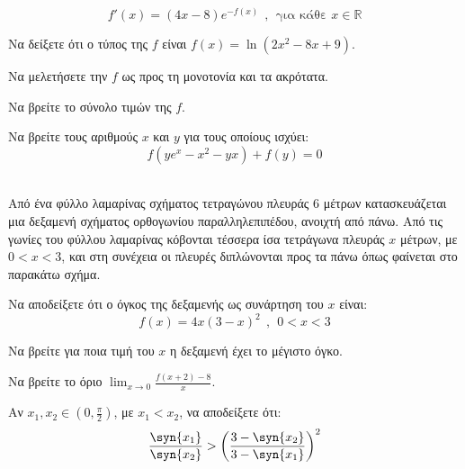 \documentclass[twoside,nofonts,internet,math,spyros]{frontisthrio-diag}
\begin{document}
\begin{thema}
\[ f'(x)=(4x-8)e^{-f(x)}\ \ ,\ \ \textrm{για κάθε }x\in\mathbb{R} \]
\begin{erwthma}
\item Να δείξετε ότι ο τύπος της $ f $ είναι $ f(x)=\ln{\left(2x^2-8x+9\right)} $.
\item Να μελετήσετε την $ f $ ως προς τη μονοτονία και τα ακρότατα.
\item Να βρείτε το σύνολο τιμών της $ f $.
\item Να βρείτε τους αριθμούς $ x $ και $ y $ για τους οποίους ισχύει:
\[ f\left( ye^x-x^2-yx\right)+f(y)=0 \]
\end{erwthma}
\item \mbox{}\\
Από ένα φύλλο λαμαρίνας σχήματος τετραγώνου πλευράς $ 6 $ μέτρων κατασκευάζεται μια δεξαμενή σχήματος ορθογωνίου παραλληλεπιπέδου, ανοιχτή από πάνω. Από τις γωνίες του φύλλου λαμαρίνας κόβονται τέσσερα ίσα τετράγωνα πλευράς $ x $ μέτρων, με $ 0<x<3 $, και στη συνέχεια οι πλευρές διπλώνονται προς τα πάνω όπως φαίνεται στο παρακάτω σχήμα.
\begin{center}
\end{center}
\begin{erwthma}
\item Να αποδείξετε ότι ο όγκος της δεξαμενής ως συνάρτηση του $ x $ είναι:
\[ f(x)=4x(3-x)^2\ \ ,\ \ 0<x<3 \]
\item Να βρείτε για ποια τιμή του $ x $ η δεξαμενή έχει το μέγιστο όγκο.
\item Να βρείτε το όριο $ {\displaystyle{\lim_{x\to 0}{\frac{f(x+2)-8}{x}}}} $.
\item Αν $ x_1,x_2\in\left(0,\frac{\pi}{2} \right) $, με $ x_1<x_2 $, να αποδείξετε ότι:
\[ \frac{\syn{x_1}}{\syn{x_2}}>\left(\frac{3-\syn{x_2}}{3-\syn{x_1}} \right)^2  \]
\end{erwthma}
\end{thema}
\kaliepityxia
\end{document}

